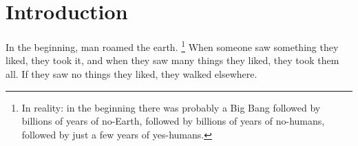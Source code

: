 \section{Introduction}

In the beginning, man roamed the earth. \footnote{In reality: in the beginning there was probably a Big Bang followed by billions of years of no-Earth, followed by billions of years of no-humans, followed by just a few years of yes-humans.}
When someone saw something they liked, they took it, and when they saw many things they liked, they took them all.
If they saw no things they liked, they walked elsewhere.

